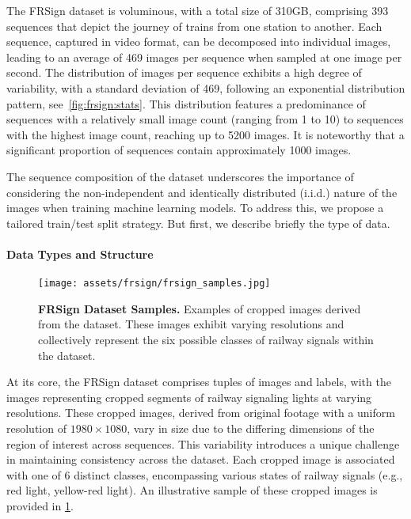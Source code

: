 The FRSign dataset is voluminous, with a total size of 310GB, comprising 393 sequences that depict the journey of trains from one station to another. Each sequence, captured in video format, can be decomposed into individual images, leading to an average of 469 images per sequence when sampled at one image per second. The distribution of images per sequence exhibits a high degree of variability, with a standard deviation of 469, following an exponential distribution pattern, see~\autoref{fig:frsign:stats}. This distribution features a predominance of sequences with a relatively small image count (ranging from 1 to 10) to sequences with the highest image count, reaching up to 5200 images. It is noteworthy that a significant proportion of sequences contain approximately 1000 images. 

The sequence composition of the dataset underscores the importance of considering the non-independent and identically distributed (i.i.d.) nature of the images when training machine learning models. To address this, we propose a tailored train/test split strategy. But first, we describe briefly the type of data.

\paragraph{Data Types and Structure}

\begin{figure}[ht]
    \centering
    \texttt{[image: assets/frsign/frsign\_samples.jpg]}
    \caption{\textbf{FRSign Dataset Samples.} Examples of cropped images derived from the dataset. These images exhibit varying resolutions and collectively represent the six possible classes of railway signals within the dataset.}
    \label{fig:frsign:samples}
\end{figure}

At its core, the FRSign dataset comprises tuples of images and labels, with the images representing cropped segments of railway signaling lights at varying resolutions. These cropped images, derived from original footage with a uniform resolution of $1980\times1080$, vary in size due to the differing dimensions of the region of interest across sequences. This variability introduces a unique challenge in maintaining consistency across the dataset. Each cropped image is associated with one of 6 distinct classes, encompassing various states of railway signals (e.g., red light, yellow-red light). An illustrative sample of these cropped images is provided in \ref{fig:frsign:samples}.

